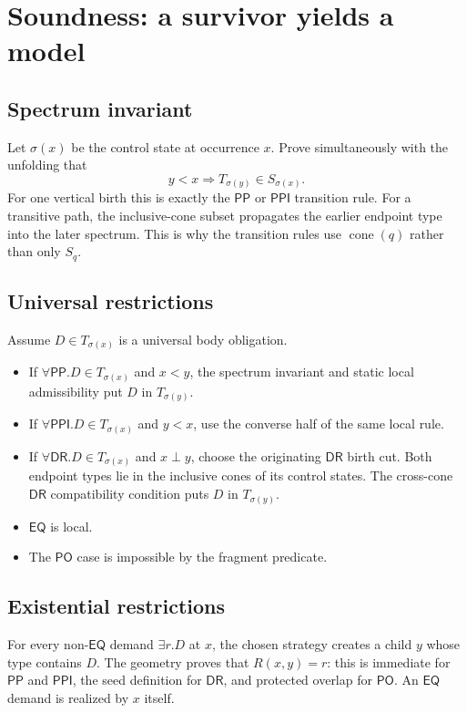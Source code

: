 \documentclass[11pt]{article}
\newcommand{\PP}{\mathsf{PP}}
\newcommand{\PPI}{\mathsf{PPI}}
\newcommand{\PO}{\mathsf{PO}}
\newcommand{\DR}{\mathsf{DR}}
\newcommand{\EQ}{\mathsf{EQ}}
\newcommand{\cone}{\operatorname{cone}}
\begin{document}
\section{Soundness: a survivor yields a model}

\subsection{Spectrum invariant}

Let $\sigma(x)$ be the control state at occurrence $x$. Prove simultaneously with the
unfolding that
\[
  y<x \Longrightarrow T_{\sigma(y)}\in S_{\sigma(x)}.
\]
For one vertical birth this is exactly the $\PP$ or $\PPI$ transition rule. For a
transitive path, the inclusive-cone subset propagates the earlier endpoint type into the
later spectrum. This is why the transition rules use $\cone(q)$ rather than only $S_q$.

\subsection{Universal restrictions}

Assume $D\in T_{\sigma(x)}$ is a universal body obligation.

\begin{itemize}
  \item If $\forall\PP.D\in T_{\sigma(x)}$ and $x<y$, the spectrum invariant and static
        local admissibility put $D$ in $T_{\sigma(y)}$.
  \item If $\forall\PPI.D\in T_{\sigma(x)}$ and $y<x$, use the converse half of the same
        local rule.
  \item If $\forall\DR.D\in T_{\sigma(x)}$ and $x\perp y$, choose the originating $\DR$
        birth cut. Both endpoint types lie in the inclusive cones of its control states.
        The cross-cone $\DR$ compatibility condition puts $D$ in $T_{\sigma(y)}$.
  \item $\EQ$ is local.
  \item The $\PO$ case is impossible by the fragment predicate.
\end{itemize}

\subsection{Existential restrictions}

For every non-$\EQ$ demand $\exists r.D$ at $x$, the chosen strategy creates a child $y$
whose type contains $D$. The geometry proves that $R(x,y)=r$: this is immediate for
$\PP$ and $\PPI$, the seed definition for $\DR$, and protected overlap for $\PO$.
An $\EQ$ demand is realized by $x$ itself.
\end{document}
